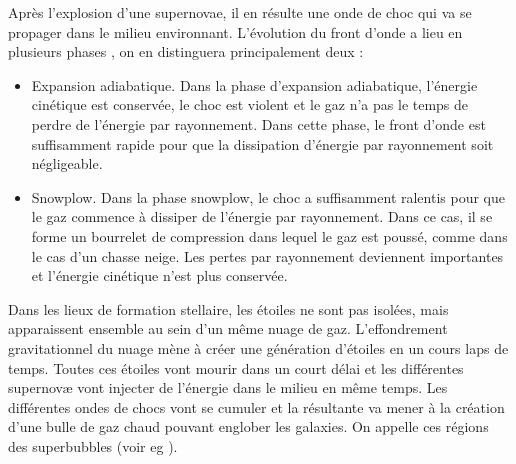 
Après l'explosion d'une supernovae, il en résulte une onde de choc qui va se propager dans le milieu environnant.
L'évolution du front d'onde a lieu en plusieurs phases \citep{1998ApJ...500..342B,1974ApJ...188..501C}, on en distinguera principalement deux : 

\begin{itemize}
\item Expansion adiabatique.
Dans la phase d'expansion adiabatique, l'énergie cinétique est conservée, le choc est violent et le gaz n'a pas le temps de perdre de l'énergie par rayonnement.
Dans cette phase, le front d'onde est suffisamment rapide pour que la dissipation d'énergie par rayonnement soit négligeable.

\item Snowplow.
Dans la phase snowplow, le choc a suffisamment ralentis pour que le gaz commence à dissiper de l'énergie par rayonnement.
Dans ce cas, il se forme un bourrelet de compression dans lequel le gaz est poussé, comme dans le cas d'un chasse neige. 
Les pertes par rayonnement deviennent importantes et l'énergie cinétique n'est plus conservée.
\end{itemize}


Dans les lieux de formation stellaire, les étoiles ne sont pas isolées, mais apparaissent ensemble au sein d'un même nuage de gaz.
L'effondrement gravitationnel du nuage mène à créer une génération d’étoiles en un cours laps de temps.
Toutes ces étoiles vont mourir dans un court délai et les différentes supernovæ vont injecter de l’énergie dans le milieu en même temps.
Les différentes ondes de chocs vont se cumuler et la résultante va mener à la création d'une bulle de gaz chaud pouvant englober les galaxies.
On appelle ces régions des superbubbles (voir eg \cite{1986PASJ...38..697T,keller_superbubble_2014,2017ApJ...834...25K}).

